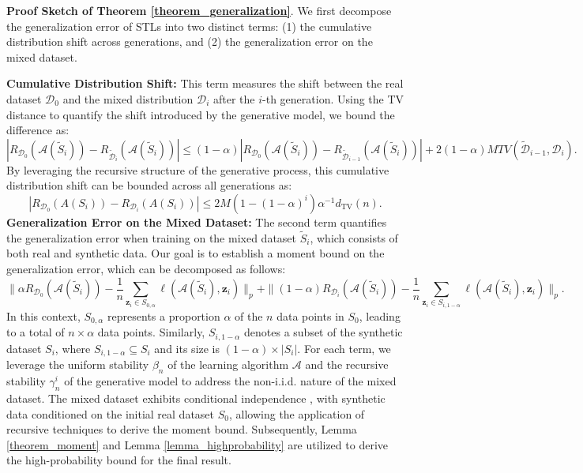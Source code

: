 \begin{remark}\textbf{Proof Sketch of Theorem \ref{theorem_generalization}}. We first decompose the generalization error of STLs into two distinct terms: (1) the cumulative distribution shift across generations, and (2) the generalization error on the mixed dataset.

\textbf{Cumulative Distribution Shift:} This term measures the shift between the real dataset $\mathcal{D}_{0}$ and the mixed distribution $\mathcal{D}_i$ after the $i$-th generation. Using the TV distance to quantify the shift introduced by the generative model, we bound the difference as:
$$\left|R_{\mathcal{D}_0}(\mathcal{A}(\widetilde{S}_i))-R_{\widetilde{\mathcal{D}}_i}(\mathcal{A}(\widetilde{S}_i))\right|\leq(1-\alpha)\left|R_{\mathcal{D}_0}(\mathcal{A}(\widetilde{S}_i))-R_{\widetilde{\mathcal{D}}_{i-1}}(\mathcal{A}(\widetilde{S}_i))\right|+2(1-\alpha)MTV(\widetilde{\mathcal{D}}_{i-1},\mathcal{D}_i).$$
By leveraging the recursive structure of the generative process, this cumulative distribution shift can be bounded across all generations as:
$$|R_{\mathcal{D}_0}(A(S_i))-R_{\mathcal{D}_i}(A(S_i))|\leq2M\left(1-(1-\alpha)^i\right)\alpha^{-1}d_{\mathrm{TV}}(n).$$
\textbf{Generalization Error on the Mixed Dataset:} The second term quantifies the generalization error when training on the mixed dataset $\widetilde{S}_{i}$, which consists of both real and synthetic data. Our goal is to establish a moment bound on the generalization error, which can be decomposed as follows:
$$\|\alpha R_{\mathcal{D}_0}(\mathcal{A}(\widetilde{S}_i))-\frac{1}{n}\sum_{\boldsymbol{z}_i\in S_{0,\alpha}}\ell(\mathcal{A}(\widetilde{S}_i),\boldsymbol{z}_i)\|_p+\|(1-\alpha)R_{\mathcal{D}_i}(\mathcal{A}(\widetilde{S}_i))-\frac{1}{n}\sum_{\boldsymbol{z}_i\in S_{i,1-\alpha}}\ell(\mathcal{A}(\widetilde{S}_i),\boldsymbol{z}_i)\|_p.$$
In this context, \(S_{0,\alpha}\) represents 
a proportion \(\alpha\) of the \(n\) data points in \(S_0\), leading to a total 
of \(n \times \alpha\) data points. Similarly, \(S_{i,1-\alpha}\) denotes a 
subset of the synthetic dataset \(S_i\), where \(S_{i,1-\alpha} \subseteq S_i\) 
and its size is \((1 - \alpha) \times |S_i|\).  For each term, we leverage the uniform stability $\beta_n$ of the learning algorithm $\mathcal{A}$ and the
recursive stability $\gamma_n^i$ of the generative model to address the non-i.i.d. nature of the mixed dataset. The mixed dataset exhibits conditional independence \citep{zheng2023toward}, with synthetic data conditioned on the initial real dataset $S_0$, allowing the application of recursive techniques to derive the moment bound. Subsequently, Lemma \ref{theorem_moment} and Lemma \ref{lemma_highprobability} are utilized to derive the high-probability bound for the final result.
\end{remark}
